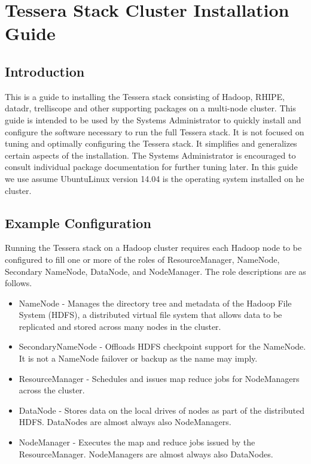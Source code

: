\section{Tessera Stack Cluster Installation Guide}
\subsection{Introduction}
This is a guide to installing the Tessera stack consisting of
Hadoop\textregistered, RHIPE, datadr, trelliscope and other supporting
packages on a multi-node cluster.  This guide is intended to be used
by the Systems Administrator to quickly install and configure the
software necessary to run the full Tessera stack.  It is not focused
on tuning and optimally configuring the Tessera stack.  It simplifies
and generalizes certain aspects of the installation.  The Systems
Administrator is encouraged to consult individual package
documentation for further tuning later.  In this guide we use assume
Ubuntu\textregistered Linux version 14.04 is the operating system
installed on he cluster.

\subsection{Example Configuration}
Running the Tessera stack on a Hadoop cluster requires each Hadoop node to be configured to fill one or more of the roles of ResourceManager, NameNode, Secondary NameNode, DataNode, and NodeManager. The role descriptions are as follows.

\begin{itemize}
\item NameNode - Manages the directory tree and metadata of the Hadoop File System (HDFS), a distributed virtual file system that allows data to be replicated and stored across many nodes in the cluster. 
\item SecondaryNameNode - Offloads HDFS checkpoint support for the NameNode.  It is not a NameNode failover or backup as the name may imply.
\item ResourceManager - Schedules and issues map reduce jobs for NodeManagers across the cluster.
\item DataNode - Stores data on the local drives of nodes as part of the distributed HDFS.  DataNodes are almost always also NodeManagers.
\item NodeManager - Executes the map and reduce jobs issued by the ResourceManager. NodeManagers are almost always also DataNodes.
\end{itemize}

